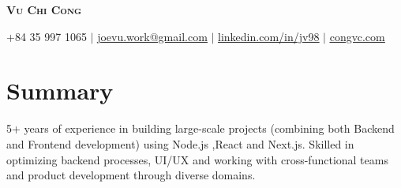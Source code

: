 \documentclass[letterpaper,11pt]{article}
\newcommand{\resumeDesc}[1]{
  {#1\\ \vspace{2px}}
}
\begin{document}

\begin{center}
    \textbf{\Huge \scshape Vu Chi Cong} \par \vspace{1pt}
    \small +84 35 997 1065 $|$ \href{mailto:joevu.work@gmail.com}{\underline{joevu.work@gmail.com}} $|$ 
    \href{https://linkedin.com/in/jv98}{\underline{linkedin.com/in/jv98}} $|$
    \href{https://congvc.com}{\underline{congvc.com}}
\end{center}

\section{Summary}
\resumeDesc{5+ years of experience in building large-scale projects (combining both Backend and Frontend development) using Node.js ,React and Next.js. Skilled in optimizing backend processes, UI/UX and working with cross-functional teams and product development through diverse domains.}


\end{document}
